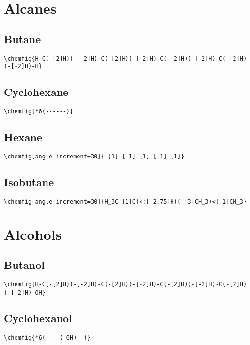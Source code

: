 \chapter{Alcanes}\label{app:alcanes}
\section{Butane}\label{app:butane}
\begin{lstlisting}
\chemfig{H-C(-[2]H)(-[-2]H)-C(-[2]H)(-[-2]H)-C(-[2]H)(-[-2]H)-C(-[2]H)(-[-2]H)-H}
\end{lstlisting}

\section{Cyclohexane}\label{app:cyclohexane}
\begin{lstlisting}
\chemfig{*6(------)}
\end{lstlisting}

\section{Hexane}\label{app:hexane}
\begin{lstlisting}
\chemfig[angle increment=30]{-[1]-[-1]-[1]-[-1]-[1]}
\end{lstlisting}

\section{Isobutane}\label{app:isobutane}
\begin{lstlisting}
\chemfig[angle increment=30]{H_3C-[1]C(<:[-2.75]H)(-[3]CH_3)<[-1]CH_3}
\end{lstlisting}



\chapter{Alcohols}\label{app:alcohols}
\section{Butanol}\label{app:butanol}
\begin{lstlisting}
\chemfig{H-C(-[2]H)(-[-2]H)-C(-[2]H)(-[-2]H)-C(-[2]H)(-[-2]H)-C(-[2]H)(-[-2]H)-OH}
\end{lstlisting}

\section{Cyclohexanol}\label{app:cyclohexanol}
\begin{lstlisting}
\chemfig{*6(----(-OH)--)}
\end{lstlisting}

